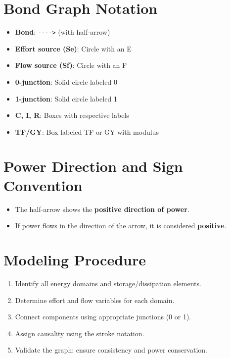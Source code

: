 \documentclass[12pt]{article}
\begin{document}
\section*{Bond Graph Notation}
\begin{multicols}{2}
\begin{itemize}
    \item \textbf{Bond}: \verb|---->| (with half-arrow)
    \item \textbf{Effort source (Se)}: Circle with an E
    \item \textbf{Flow source (Sf)}: Circle with an F
    \item \textbf{0-junction}: Solid circle labeled 0
    \item \textbf{1-junction}: Solid circle labeled 1
    \item \textbf{C, I, R}: Boxes with respective labels
    \item \textbf{TF/GY}: Box labeled TF or GY with modulus
\end{itemize}
\end{multicols}

\section*{Power Direction and Sign Convention}
\begin{itemize}
    \item The half-arrow shows the \textbf{positive direction of power}.
    \item If power flows in the direction of the arrow, it is considered \textbf{positive}.
\end{itemize}

\section*{Modeling Procedure}
\begin{enumerate}
    \item Identify all energy domains and storage/dissipation elements.
    \item Determine effort and flow variables for each domain.
    \item Connect components using appropriate junctions (0 or 1).
    \item Assign causality using the stroke notation.
    \item Validate the graph: ensure consistency and power conservation.
\end{enumerate}
\end{document}
